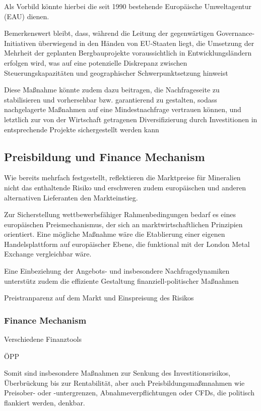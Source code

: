 \documentclass[12pt,a4paper,oneside]{book} %
\begin{document}
Als Vorbild könnte hierbei die seit 1990 bestehende Europäische Umweltagentur (EAU) dienen.

Bemerkenswert bleibt, dass, während die Leitung der gegenwärtigen Governance-Initiativen überwiegend in den Händen von EU-Staaten liegt, die Umsetzung der Mehrheit der geplanten Bergbauprojekte voraussichtlich in Entwicklungsländern erfolgen wird, was auf eine potenzielle Diskrepanz zwischen Steuerungskapazitäten und geographischer Schwerpunktsetzung hinweist

Diese Maßnahme könnte zudem dazu beitragen, die Nachfrageseite zu stabilisieren und vorhersehbar bzw. garantierend zu gestalten, sodass nachgelagerte Maßnahmen auf eine Mindestnachfrage vertrauen können, und letztlich zur von der Wirtschaft getragenen Diversifizierung durch Investitionen in entsprechende Projekte sichergestellt werden kann

\subsection{Preisbildung und Finance Mechanism}
Wie bereits mehrfach festgestellt, reflektieren die Marktpreise für Mineralien nicht das enthaltende Risiko und erschweren zudem europäischen und anderen alternativen Lieferanten den Markteinstieg.

Zur Sicherstellung wettbewerbsfähiger Rahmenbedingungen bedarf es eines europäischen Preismechanismus, der sich an marktwirtschaftlichen Prinzipien orientiert. Eine mögliche Maßnahme wäre die Etablierung einer eigenen Handelsplattform auf europäischer Ebene, die funktional mit der London Metal Exchange vergleichbar wäre.

Eine Einbeziehung der Angebots- und insbesondere Nachfragedynamiken unterstütz zudem die effiziente Gestaltung finanziell-politischer Maßnahmen

Preistranparenz auf dem Markt und Einspreisung des Risikos


\subsubsection{Finance Mechanism}
Verschiedene Finanztools

ÖPP

Somit sind insbesondere Maßnahmen zur Senkung des Investitionsrisikos, Überbrückung bis zur Rentabilität, aber auch Preisbildungsmaßmnahmen wie Preisober- oder -untergrenzen, Abnahmeverpflichtungen oder CFDs, die politisch flankiert werden, denkbar. 
\end{document}
